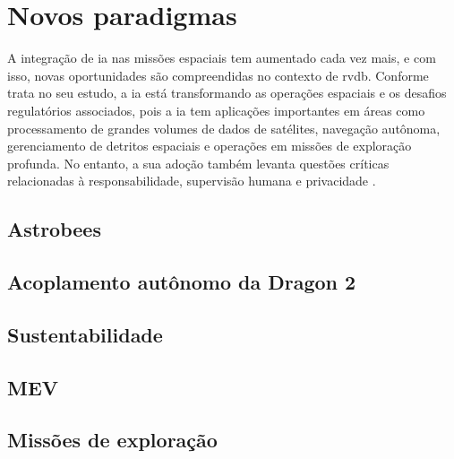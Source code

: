 \section{Novos paradigmas}

A integração de \gls{ia} nas missões espaciais tem aumentado cada vez mais, e com isso, novas oportunidades são compreendidas no contexto de \gls{rvdb}. 
Conforme \cite{martin2021} trata no seu estudo, a \gls{ia} está transformando as operações espaciais e os desafios regulatórios associados, pois a \gls{ia} tem aplicações importantes em áreas como processamento de grandes volumes de dados de satélites, navegação autônoma, gerenciamento de detritos espaciais e operações em missões de exploração profunda.
No entanto, a sua adoção também levanta questões críticas relacionadas à responsabilidade, supervisão humana e privacidade \cite{martin2021}.


\subsection{Astrobees}


\subsection{Acoplamento autônomo da Dragon 2}


\subsection{Sustentabilidade}


\subsection{MEV}


\subsection{Missões de exploração}


